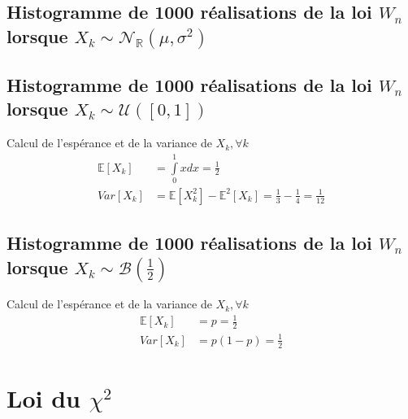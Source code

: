 \documentclass{report}
\begin{document}
		\subsection{Histogramme de 1000 réalisations de la loi $W_n$ lorsque $X_k \sim \mathcal{N}_{\mathbb{R}}(\mu, \sigma^2)$}
		\subsection{Histogramme de 1000 réalisations de la loi $W_n$ lorsque $X_k \sim \mathcal{U}([0,1])$}
		Calcul de l'espérance et de la variance de $X_k, \forall k$
		\begin{align*}
			\mathbb{E}[X_k] &= \int\limits_0^1 x dx = \frac{1}{2}\\
			Var[X_k] &= \mathbb{E}[X_k^2] - \mathbb{E}^2[X_k] = \frac{1}{3} - \frac{1}{4} = \frac{1}{12}
		\end{align*}
		\subsection{Histogramme de 1000 réalisations de la loi $W_n$ lorsque $X_k \sim \mathcal{B}(\frac{1}{2}) $}
		Calcul de l'espérance et de la variance de $X_k, \forall k$
		\begin{align*}
			\mathbb{E}[X_k] &= p = \frac{1}{2}\\
			Var[X_k] &= p(1-p) = \frac{1}{2}
		\end{align*}
		
	\section{Loi du $\chi^2$}
\end{document}
